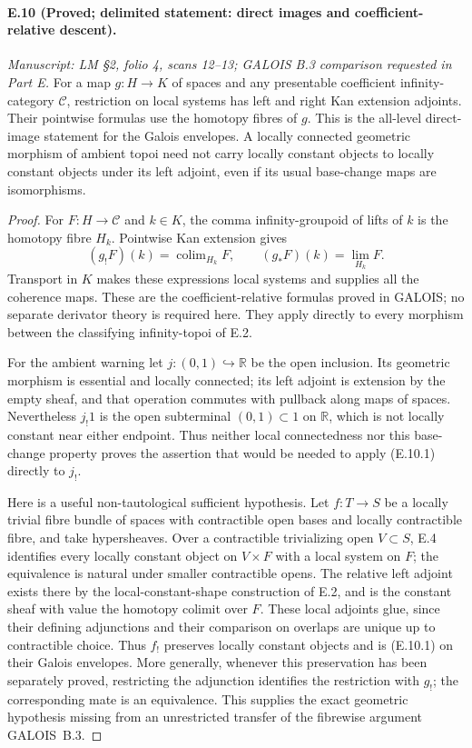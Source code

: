 \paragraph{E.10 (Proved; delimited statement: direct images and coefficient-relative descent).}
\textit{Manuscript: LM \S2, folio 4, scans 12--13; GALOIS B.3 comparison requested in Part E.}
For a map $g:H\to K$ of spaces and any presentable coefficient infinity-category $\mathcal C$, restriction on local systems has left and right Kan extension adjoints. Their pointwise formulas use the homotopy fibres of $g$. This is the all-level direct-image statement for the Galois envelopes. A locally connected geometric morphism of ambient topoi need not carry locally constant objects to locally constant objects under its left adjoint, even if its usual base-change maps are isomorphisms.
\begin{proof}
For $F:H\to\mathcal C$ and $k\in K$, the comma infinity-groupoid of lifts of $k$ is the homotopy fibre $H_k$. Pointwise Kan extension gives
\[
 (g_!F)(k)=\operatorname{colim}_{H_k}F,
 \qquad (g_*F)(k)=\lim_{H_k}F.
                                                        \tag{E.10.1}
\]
Transport in $K$ makes these expressions local systems and supplies all the coherence maps. These are the coefficient-relative formulas proved in GALOIS; no separate derivator theory is required here. They apply directly to every morphism between the classifying infinity-topoi of E.2.

For the ambient warning let $j:(0,1)\hookrightarrow\mathbb R$ be the open inclusion. Its geometric morphism is essential and locally connected; its left adjoint is extension by the empty sheaf, and that operation commutes with pullback along maps of spaces. Nevertheless $j_!1$ is the open subterminal $(0,1)\subset1$ on $\mathbb R$, which is not locally constant near either endpoint. Thus neither local connectedness nor this base-change property proves the assertion that would be needed to apply (E.10.1) directly to $j_!$.

Here is a useful non-tautological sufficient hypothesis. Let $f:T\to S$ be a locally trivial fibre bundle of spaces with contractible open bases and locally contractible fibre, and take hypersheaves. Over a contractible trivializing open $V\subset S$, E.4 identifies every locally constant object on $V\times F$ with a local system on $F$; the equivalence is natural under smaller contractible opens. The relative left adjoint exists there by the local-constant-shape construction of E.2, and is the constant sheaf with value the homotopy colimit over $F$. These local adjoints glue, since their defining adjunctions and their comparison on overlaps are unique up to contractible choice. Thus $f_!$ preserves locally constant objects and is (E.10.1) on their Galois envelopes. More generally, whenever this preservation has been separately proved, restricting the adjunction identifies the restriction with $g_!$; the corresponding mate is an equivalence. This supplies the exact geometric hypothesis missing from an unrestricted transfer of the fibrewise argument GALOIS~B.3. 
\end{proof}

